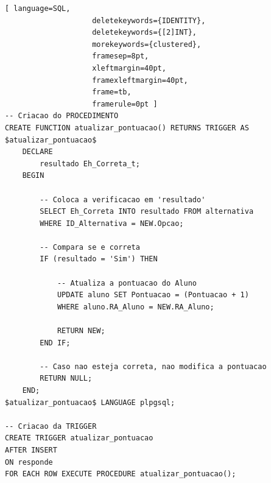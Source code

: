 \documentclass[12pt,a4paper]{article}
\begin{document}
\begin{lstlisting}[ language=SQL,
                    deletekeywords={IDENTITY},
                    deletekeywords={[2]INT},
                    morekeywords={clustered},
                    framesep=8pt,
                    xleftmargin=40pt,
                    framexleftmargin=40pt,
                    frame=tb,
                    framerule=0pt ]
-- Criacao do PROCEDIMENTO
CREATE FUNCTION atualizar_pontuacao() RETURNS TRIGGER AS $atualizar_pontuacao$
    DECLARE
        resultado Eh_Correta_t;
    BEGIN
        
        -- Coloca a verificacao em 'resultado'
        SELECT Eh_Correta INTO resultado FROM alternativa 
        WHERE ID_Alternativa = NEW.Opcao; 
        
        -- Compara se e correta
        IF (resultado = 'Sim') THEN
            
            -- Atualiza a pontuacao do Aluno
            UPDATE aluno SET Pontuacao = (Pontuacao + 1) 
            WHERE aluno.RA_Aluno = NEW.RA_Aluno; 
            
            RETURN NEW;
        END IF;
    
        -- Caso nao esteja correta, nao modifica a pontuacao
        RETURN NULL;
    END;
$atualizar_pontuacao$ LANGUAGE plpgsql;

-- Criacao da TRIGGER
CREATE TRIGGER atualizar_pontuacao 
AFTER INSERT 
ON responde
FOR EACH ROW EXECUTE PROCEDURE atualizar_pontuacao();
\end{lstlisting}
\end{document}
